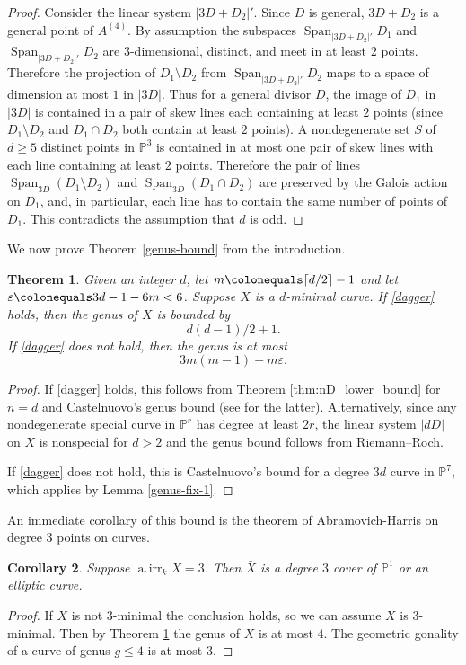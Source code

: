 \documentclass[11pt]{amsart}
\newcommand{\PP}{\mathbb{P}}
\newcommand{\pp}{\mathbb{P}}
\newcommand{\airr}{\operatorname{a.\!irr}}
\newcommand{\Span}{\operatorname{Span}}
\newtheorem{theorem}{Theorem}[section]
\newtheorem{corollary}[theorem]{Corollary}
\theoremstyle{definition}
\theoremstyle{remark}
\begin{document}
\begin{proof}
Consider the linear system $|3D + D_2|'$.  Since \(D\) is general, \(3D + D_2\) is a general point of \(A^{(4)}\). By assumption the subspaces $\Span_{|3D + D_2|'}D_1$ and $\Span_{|3D + D_2|'} D_2$ are $3$-dimensional, distinct, and meet in at least \(2\) points. Therefore the projection of $D_1 \setminus D_2$ from $\Span_{|3D + D_2|'} D_2$ maps to a space of dimension at most $1$ in \(|3D|\). Thus for a general divisor $D$, the image of $D_1$ in $|3D|$ is contained in a pair of skew lines each containing at least $2$ points (since $D_1 \setminus D_2$ and $D_1 \cap D_2$ both contain at least $2$ points). A nondegenerate set $S$ of $d \geqslant 5$ distinct points in \(\pp^3\) is contained in at most one pair of skew lines with each line containing at least $2$ points. Therefore the pair of lines $\Span_{3D} (D_1 \setminus D_2)$ and $\Span_{3D} (D_1 \cap D_2)$ are preserved by the Galois action on $D_1$, and, in particular, each line has to contain the same number of points of $D_1$. This contradicts the assumption that $d$ is odd.
\end{proof}

We now prove Theorem \ref{genus-bound} from the introduction.

\begin{theorem}\label{thm:weak-genus-bound}
Given an integer $d$, let $m \colonequals \lceil d/2\rceil -1$ and let $\varepsilon \colonequals 3d-1-6m<6$. Suppose $X$ is a $d$-minimal curve. If \eqref{dagger} holds, then the genus of $X$ is bounded by \[d(d-1)/2 + 1.\] If \eqref{dagger} does not hold, then the genus is at most \[ 3m(m-1)+m\varepsilon.\]
\end{theorem}
\begin{proof}
If \eqref{dagger} holds, this follows from Theorem \ref{thm:nD_lower_bound} for $n=d$ and Castelnuovo's genus bound (see \cite[Chapter III, page 116]{ACGH} for the latter).  Alternatively, since any nondegenerate special curve in \(\pp^r\) has degree at least \(2r\), the linear system \(|dD|\) on \(X\) is nonspecial for \(d > 2\) and the genus bound follows from Riemann--Roch.

If \eqref{dagger} does not hold, this is Castelnuovo's bound for a degree $3d$ curve in $\PP^7$, which applies by Lemma \ref{genus-fix-1}.
\end{proof}

An immediate corollary of this bound is the theorem of Abramovich-Harris on degree $3$ points on curves.
\begin{corollary}\label{cor:3-min}
Suppose $\airr_k X =3$. Then $\bar{X}$ is a degree $3$ cover of $\pp^1$ or an elliptic curve.
\end{corollary}
\begin{proof}
If $X$ is not $3$-minimal the conclusion holds, so we can assume $X$ is $3$-minimal. Then by Theorem \ref{thm:weak-genus-bound} the genus of $X$ is at most $4$. The geometric gonality of a curve of genus $g \leqslant 4$ is at most $3$.
\end{proof}
\end{document}
